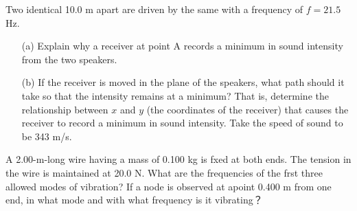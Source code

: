 \begin{example}
	Two identical  10.0 m apart are driven by the same  with a frequency of \( f = 21.5 \) Hz.
    \begin{center}
	\end{center}
	\begin{enumerate}
		\item[(a)] Explain why a receiver at point A records a minimum in sound intensity from the two speakers.
		\item[(b)] If the receiver is moved in the plane of the speakers, what path should it take so that the intensity remains at a minimum? That is, determine the relationship between \( x \) and \( y \) (the coordinates of the receiver) that causes the receiver to record a minimum in sound intensity. Take the speed of sound to be 343 m/s.
	\end{enumerate}
\end{example}

\begin{example}
	A 2.00-m-long wire having a mass of 0.100 kg is fxed at both ends. The tension in the wire is maintained at 20.0 N. What are the frequencies of the frst three allowed modes of vibration? If a node is observed at apoint 0.400 m from one end, in what mode and with what frequency is it vibrating？
\end{example}